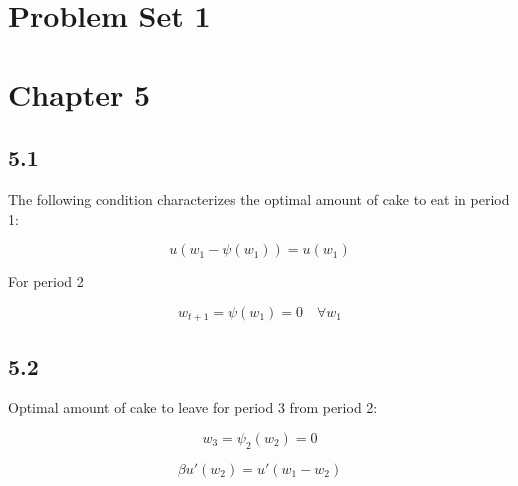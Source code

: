\documentclass[letterpaper,12pt]{article}
\theoremstyle{definition}
\begin{document}
\iffalse
\section{First Section}\label{SecFirst}

  Put first section text here. You can even reference Section \ref{SecFirst} with hyperlinks.

  Here is an equation.
  \begin{equation}\label{EqPopDef}
    N_t\equiv\sum_{s=1}^{E+S} \omega_{s,t} \quad\forall t
  \end{equation}

  \begin{equation}\label{EqPopDef}
    B_t\equiv\sum_{s=1}^{E+S} \omega_{s,t} \quad\forall t
  \end{equation}


  Below is some commented out text for a figure. I have commented it out because I didn't include the figure file with this template. Learn everything else on your own.
\fi

\section*{Problem Set 1}

\section*{Chapter 5}

\subsection*{5.1}

The following condition characterizes the optimal amount of cake to eat in period 1:



  \[ u (w_1 - \psi (w_1) ) = u(w_1)  \]
  
For period 2

\[ w_{t+1}=\psi(w_1) = 0 \quad \forall  w_1\]


\subsection*{5.2}

Optimal amount of cake to leave for period 3 from period 2:

\[w_3 = \psi_2(w_2) = 0\]

\[\beta u'(w_2) = u'(w_1 - w_2)\]
\end{document}
